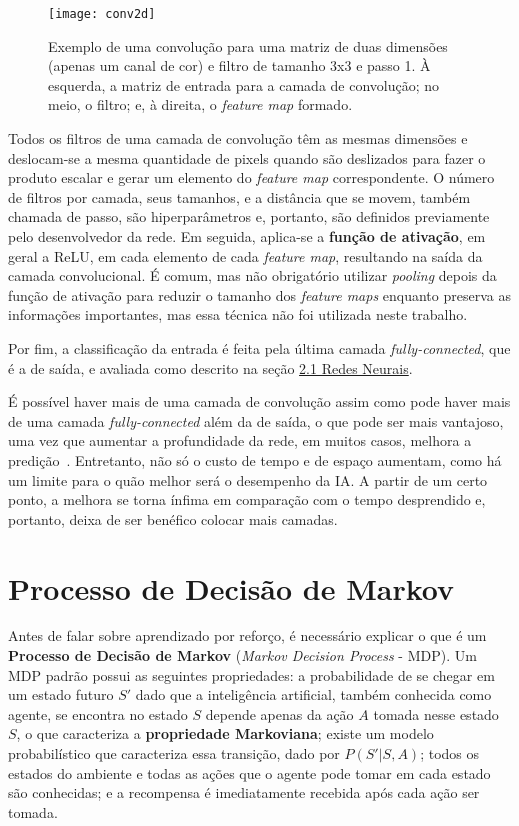 \begin{figure}[h!]
\texttt{[image: conv2d]}
\centering
\caption{Exemplo de uma convolução para uma matriz de duas dimensões (apenas um canal de cor) e filtro de tamanho 3x3 e passo 1. À esquerda, a matriz de entrada para a camada de convolução; no meio, o filtro; e, à direita, o \textit{feature map} formado.}
\label{fig:conv2d}
\end{figure}

Todos os filtros de uma camada de convolução têm as mesmas dimensões e deslocam-se a mesma quantidade de pixels quando são deslizados para fazer o produto escalar e gerar um elemento do \textit{feature map} correspondente.
O número de filtros por camada, seus tamanhos, e a distância que se movem, também chamada de passo, são hiperparâmetros e, portanto, são definidos previamente pelo desenvolvedor da rede.
Em seguida, aplica-se a \textbf{função de ativação}, em geral a ReLU, em cada elemento de cada \textit{feature map}, resultando na saída da camada convolucional.
É comum, mas não obrigatório utilizar \textit{pooling} depois da função de ativação para reduzir o tamanho dos \textit{feature maps} enquanto preserva as informações importantes, mas essa técnica não foi utilizada neste trabalho.

Por fim, a classificação da entrada é feita pela última camada \textit{fully-connected}, que é a de saída, e avaliada como descrito na seção \hyperref[sec:nn]{2.1 Redes Neurais}.

É possível haver mais de uma camada de convolução assim como pode haver mais de uma camada \textit{fully-connected} além da de saída, o que pode ser mais vantajoso, uma vez que aumentar a profundidade da rede, em muitos casos, melhora a predição~\cite{Goodfellow-et-al-2016}.
Entretanto, não só o custo de tempo e de espaço aumentam, como há um limite para o quão melhor será o desempenho da IA.
A partir de um certo ponto, a melhora se torna ínfima em comparação com o tempo desprendido e, portanto, deixa de ser benéfico colocar mais camadas.


\section{Processo de Decisão de Markov}
\label{sec:mdp}

Antes de falar sobre aprendizado por reforço, é necessário explicar o que é um \textbf{Processo de Decisão de Markov} (\textit{Markov Decision Process} - MDP).
Um MDP padrão possui as seguintes propriedades:
a probabilidade de se chegar em um estado futuro $S'$ dado que a inteligência artificial, também conhecida como agente, se encontra no estado $S$ depende apenas da ação $A$ tomada nesse estado $S$, o que caracteriza a \textbf{propriedade Markoviana};
existe um modelo probabilístico que caracteriza essa transição, dado por $P(S'|S,A)$;
todos os estados do ambiente e todas as ações que o agente pode tomar em cada estado são conhecidas;
e a recompensa é imediatamente recebida após cada ação ser tomada.

